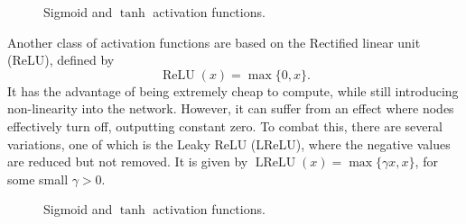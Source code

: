 \documentclass{article}
\theoremstyle{definition}
\begin{document}
\begin{figure}[H]%
    \centering
    \qquad
    \caption{Sigmoid and $\tanh$ activation functions.}%
    \label{fig:sigmoidtanh}%
\end{figure}

Another class of activation functions are based on the Rectified linear unit (ReLU), defined by
\begin{equation*}
    \operatorname{ReLU}(x) = \max\{ 0, x \}.
\end{equation*}
It has the advantage of being extremely cheap to compute, while still introducing non-linearity into the network. However, it can suffer from an effect where nodes effectively turn off, outputting constant zero. To combat this, there are several variations, one of which is the Leaky ReLU (LReLU), where the negative values are reduced but not removed. It is given by $\operatorname{LReLU}(x) = \max\{ \gamma x, x\}$, for some small $\gamma > 0$.

\begin{figure}[H]%
    \centering
    \qquad
    \caption{Sigmoid and $\tanh$ activation functions.}%
    \label{fig:sigmoidtanh}%
\end{figure}
\end{document}
